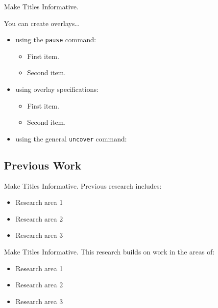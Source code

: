 \documentclass[xcolor=x11names, compress]{beamer}
\renewcommand{\(}{\begin{columns}}
\renewcommand{\)}{\end{columns}}
\newcommand{\<}[1]{\begin{column}{#1}}
\renewcommand{\>}{\end{column}}
\begin{document}
\begin{frame}{Make Titles Informative.}

  You can create overlays\dots
  \begin{itemize}
  \item using the \texttt{pause} command:
    \begin{itemize}
    \item
      First item.
      \pause
    \item    
      Second item.
    \end{itemize}
  \item
    using overlay specifications:
    \begin{itemize}
    \item<3->
      First item.
    \item<4->
      Second item.
    \end{itemize}
  \item
    using the general \texttt{uncover} command:
    \begin{itemize}
    \end{itemize}
  \end{itemize}
\end{frame}


\subsection{Previous Work}

\begin{frame}{Make Titles Informative.}
Previous research includes:
	\begin{itemize}	
	\item<1-> Research area 1
	\item<2-> Research area 2
	\item<3-> Research area 3
	\end{itemize}
\end{frame}

\begin{frame}{Make Titles Informative.}
This research builds on work in the areas of:
	\begin{itemize}	
	\item<1-> Research area 1
	\item<2-> Research area 2
	\item<3-> Research area 3
	\end{itemize}
\end{frame}
\end{document}
